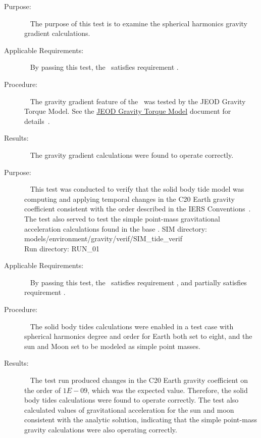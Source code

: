 \label{test:spherharm_grav_grad}
\begin{description}
\item[Purpose:] \ \newline
The purpose of this test is to examine the spherical harmonics gravity
gradient calculations.\\
\item[Applicable Requirements:] \ \newline
By passing this test, the \ModelDesc\ satisfies requirement
.
\item[Procedure:]\ \newline
The gravity gradient feature of the \ModelDesc\ was tested by the JEOD
Gravity Torque Model. See the 
\hyperref{file:\JEODHOME/models/interactions/gravity_torque/docs/gravity_torque.pdf}{part1}{reqt}
{JEOD Gravity Torque Model} document for details~\cite{dynenv:gravitytorque}.
\item[Results:]\ \newline
The gravity gradient calculations were found to operate correctly.
\end{description}


\label{test:spherharm_solid_tides}
\begin{description}
\item[Purpose:] \ \newline
This test was conducted to verify that the solid body tide model was
computing and applying temporal changes in the C20 Earth gravity coefficient
consistent with the order described in the IERS Conventions~\cite{IERS2003}.
The test also served to test the simple point-mass gravitational
acceleration calculations found in the base \ModelDesc.
SIM directory: models/environment/gravity/verif/SIM\_tide\_verif\\
Run directory: RUN\_01
\item[Applicable Requirements:] \ \newline
By passing this test, the \ModelDesc\ satisfies requirement
, and partially satisfies requirement
.
\item[Procedure:]\ \newline
The solid body tides calculations were enabled in a test case with spherical
harmonics degree and order for Earth both set to eight, and the sun and Moon
set to be modeled as simple point masses.
\item[Results:]\ \newline
The test run produced changes in the C20 Earth gravity coefficient on the order
of $1E-09$, which was the expected value. Therefore, the solid body tides
calculations were found to operate correctly. The test also calculated values
of gravitational acceleration for the sun and moon consistent with the analytic
solution, indicating that the simple point-mass gravity calculations were
also operating correctly.
\end{description}

